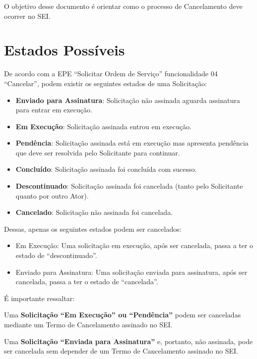 	O objetivo desse documento é orientar como o processo de Cancelamento deve ocorrer no SEI.
	
\section{Estados Possíveis}	

De acordo com a EPE ``Solicitar Ordem de Serviço'' funcionalidade 04 ``Cancelar'', podem existir os seguintes estados de uma Solicitação:

\begin{itemize}
	\item \textbf{Enviado para Assinatura}: Solicitação não assinada aguarda assinatura para entrar em execução.

	\item \textbf{Em Execução}: Solicitação assinada entrou em execução.

	\item \textbf{Pendência}: Solicitação assinada está em execução mas apresenta pendência que deve ser resolvida pelo Solicitante para continuar.

	\item \textbf{Concluído}: Solicitação assinada foi concluída com sucesso.
	
	\item \textbf{Descontinuado}: Solicitação assinada foi cancelada (tanto pelo Solicitante quanto por outro Ator).
	
	\item \textbf{Cancelado}: Solicitação não assinada foi cancelada.
	
	
\end{itemize}

Dessas, apenas os seguintes estados podem ser cancelados:
\begin{itemize}
	\item Em Execução: Uma solicitação em execução, após ser cancelada, passa a ter o estado de ``descontinuado''.
	\item Enviado para Assinatura: Uma solicitação enviada para assinatura, após ser cancelada, passa a ter o estado de ``cancelada''.
\end{itemize}

É importante ressaltar:


Uma \textbf{Solicitação ``Em Execução'' ou ``Pendência''}  podem ser canceladas  mediante um Termo de Cancelamento assinado no SEI.

Uma \textbf{Solicitação ``Enviada para Assinatura''} e, portanto, não assinada, pode ser cancelada sem depender de um Termo de Cancelamento assinado no SEI.

